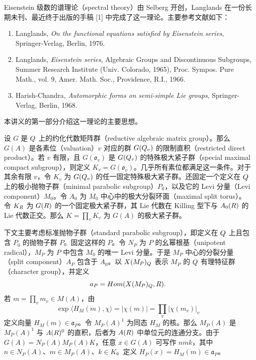 
Eisenstein 级数的谱理论（spectral theory）由 Selberg 开创，Langlands 在一份长期未刊、最近终于出版的手稿 [1] 中完成了这一理论。主要参考文献如下：
\begin{enumerate}
\item Langlands, \emph{On the functional equations satisfied by Eisenstein series}, Springer-Verlag, Berlin, 1976.
\item Langlands, \emph{Eisenstein series}, Algebraic Groups and Discontinuous Subgroups, Summer Research Institute (Univ. Colorado, 1965), Proc. Sympos. Pure Math., vol. 9, Amer. Math. Soc., Providence, R.I., 1966.
\item Harish-Chandra, \emph{Automorphic forms on semi-simple Lie groups}, Springer-Verlag, Berlin, 1968.
\end{enumerate}
本讲义的第一部分介绍这一理论的主要思想。

设 $G$ 是 $Q$ 上的约化代数矩阵群（reductive algebraic matrix group）。那么 $G(A)$ 是各素位（valuation）$v$ 对应的群 $G(Q_v)$ 的限制直积（restricted direct product）。若 $v$ 有限，且 $G(\mathfrak o_v)$ 是 $G(Q_v)$ 的特殊极大紧子群（special maximal compact subgroup），则定义 $K_v=G(\mathfrak o_v)$。几乎所有素位都满足这一条件。对于其余有限 $v$，令 $K_v$ 为 $G(Q_v)$ 的任一固定特殊极大紧子群。还固定一个定义在 $Q$ 上的极小抛物子群（minimal parabolic subgroup）$P_0$，以及它的 Levi 分量（Levi component）$M_0$。令 $A_0$ 为 $M_0$ 中心中的极大分裂环面（maximal split torus）。令 $K_R$ 为 $G(R)$ 的一个固定极大紧子群，其 Lie 代数在 Killing 型下与 $A_0(R)$ 的 Lie 代数正交。那么 $K=\prod_vK_v$ 为 $G(A)$ 的极大紧子群。

下文主要考虑标准抛物子群（standard parabolic subgroup），即定义在 $Q$ 上且包含 $P_0$ 的抛物子群 $P$。固定这样的 $P$。令 $N_P$ 为 $P$ 的幺幂根基（unipotent radical），$M_P$ 为 $P$ 中包含 $M_0$ 的唯一 Levi 分量。于是 $M_P$ 中心的分裂分量（split component）$A_P$ 包含于 $A_0$。以 $X(M_P)_Q$ 表示 $M_P$ 的 $Q$ 有理特征群（character group），并定义
\[
 a_P=Hom(X(M_P)_Q,R).
\]
若 $m=\prod_vm_v\in M(A)$，由
\[
 \exp\langle H_M(m),\chi\rangle=|\chi(m)|=\prod_v|\chi(m_v)|_v
\]
定义向量 $H_M(m)\in\mathfrak a_P$。令 $M_P(A)^1$ 为同态 $H_M$ 的核。那么 $M_P(A)$ 是 $M_P(A)^1$ 与 $A(R)^0$ 的直积，后者为 $A(R)$ 中单位元的连通分支。由于 $G(A)=N_P(A)M_P(A)K$，任意 $x\in G(A)$ 可写作 $nmk$，其中 $n\in N_P(A)$、$m\in M_P(A)$、$k\in K$。定义 $H_P(x)=H_M(m)\in\mathfrak a_P$。


